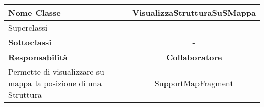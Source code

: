 
\setcounter{table}{0}
\begin{table}[H]
    \centering
    \begin{tabularx}{\textwidth}{||   X  ||  c   ||}
        \hline
        \rowcolor{Gray}
        \textbf{Nome Classe} & VisualizzaStrutturaSuSMappa\\
        \hline
        Superclassi  &   \\
        \hline
        \textbf{Sottoclassi} & - \\
        \hline
         \textbf{Responsabilità} & \textbf{Collaboratore} \\
         \hline
          Permette di visualizzare su mappa la posizione di una Struttura & SupportMapFragment \\
         \hline
    \end{tabularx}
\end{table}
